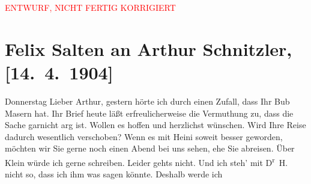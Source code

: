 
\begin{center}
            \textcolor{red}{ENTWURF, NICHT FERTIG KORRIGIERT}
                      \end{center}
            
         
         \renewcommand{\erwaehntePersonen}{Personen: Hugo Haberfeld, Richard Klein, Ottilie Salten, Heinrich Schnitzler, Olga Schnitzler, Isidor Singer}
         \renewcommand{\erwaehnteOrte}{Orte: Wien}
         \renewcommand{\erwaehnteWerke}{}
               \section[Felix Salten an Arthur Schnitzler, {[}14. 4. 1904{]}]{ Felix Salten an Arthur Schnitzler, {[}14. 4. 1904{]}}\nopagebreak{}\rehead{ }\begin{ledgroupsized}[t]{13cm}\normalsize\beginnumbering \toendnotes[C]{\smallbreak\pagebreak[2]} 
\toendnotes[C]{\smallbreak}\pstart
           \raggedleft{}{\pb}Donnerstag\pend
           \pstart
           Lieber Arthur, gestern hörte ich durch einen Zufall, dass Ihr Bub Masern hat. Ihr Brief
               heute läßt erfreulicherweise die Vermuthung zu, dass die Sache garnicht arg ist.
               Wollen es hoffen und herzlichst wünschen. Wird Ihre Reise dadurch wesentlich
               verschoben? Wenn es mit Heini soweit besser
               geworden, möchten wir Sie gerne noch einen Abend bei uns sehen, ehe Sie abreisen. \pend
           \pstart
           Über Klein würde ich gerne schreiben. Leider
               gehts nicht. Und ich steh’ mit D\textsuperscript{r} H. nicht so, dass ich ihm was sagen könnte. Deshalb werde ich

\end{ledgroupsized}
